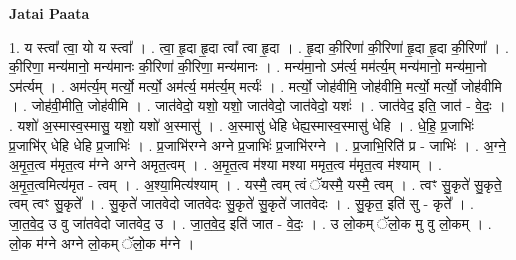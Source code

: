 \documentclass[17pt]{extarticle}
\begin{document}
\textbf{Jatai Paata} \newline

1. य स्त्वा᳚ त्वा॒ यो य स्त्वा᳚ । . त्वा॒ हृ॒दा हृ॒दा त्वा᳚ त्वा हृ॒दा । . हृ॒दा की॒रिणा॑ की॒रिणा॑ हृ॒दा हृ॒दा की॒रिणा᳚ । . की॒रिणा॒ मन्य॑मानो॒ मन्य॑मानः की॒रिणा॑ की॒रिणा॒ मन्य॑मानः । . मन्य॑मा॒नो ऽम॑र्त्य॒ मम॑र्त्य॒म् मन्य॑मानो॒ मन्य॑मा॒नो ऽम॑र्त्यम् । . अम॑र्त्य॒म् मर्त्यो॒ मर्त्यो॒ अम॑र्त्य॒ मम॑र्त्य॒म् मर्त्यः॑ । . मर्त्यो॒ जोह॑वीमि॒ जोह॑वीमि॒ मर्त्यो॒ मर्त्यो॒ जोह॑वीमि । . जोह॑वी॒मीति॒ जोह॑वीमि । . जात॑वेदो॒ यशो॒ यशो॒ जात॑वेदो॒ जात॑वेदो॒ यशः॑ । . जात॑वेद॒ इति॒ जात॑ - वे॒दः॒ । . यशो॑ अ॒स्मास्व॒स्मासु॒ यशो॒ यशो॑ अ॒स्मासु॑ । . अ॒स्मासु॑ धेहि धेह्य॒स्मास्व॒स्मासु॑ धेहि । . धे॒हि॒ प्र॒जाभिः॑ प्र॒जाभि॑र् धेहि धेहि प्र॒जाभिः॑ । . प्र॒जाभि॑रग्ने अग्ने प्र॒जाभिः॑ प्र॒जाभि॑रग्ने । . प्र॒जाभि॒रिति॑ प्र - जाभिः॑ । . अ॒ग्ने॒ अ॒मृ॒त॒त्व म॑मृत॒त्व म॑ग्ने अग्ने अमृत॒त्वम् । . अ॒मृ॒त॒त्व म॑श्या मश्या ममृत॒त्व म॑मृत॒त्व म॑श्याम् । . अ॒मृ॒त॒त्वमित्य॑मृत - त्वम् । . अ॒श्या॒मित्य॑श्याम् । . यस्मै॒ त्वम् त्वं ॅयस्मै॒ यस्मै॒ त्वम् । . त्वꣳ सु॒कृते॑ सु॒कृते॒ त्वम् त्वꣳ सु॒कृते᳚ । . सु॒कृते॑ जातवेदो जातवेदः सु॒कृते॑ सु॒कृते॑ जातवेदः । . सु॒कृत॒ इति॑ सु - कृते᳚ । . जा॒त॒वे॒द॒ उ वु जा॑तवेदो जातवेद॒ उ । . जा॒त॒वे॒द॒ इति॑ जात - वे॒दः॒ । . उ लो॒कम् ॅलो॒क मु वु लो॒कम् । . लो॒क म॑ग्ने अग्ने लो॒कम् ॅलो॒क म॑ग्ने । \newline
\end{document}
